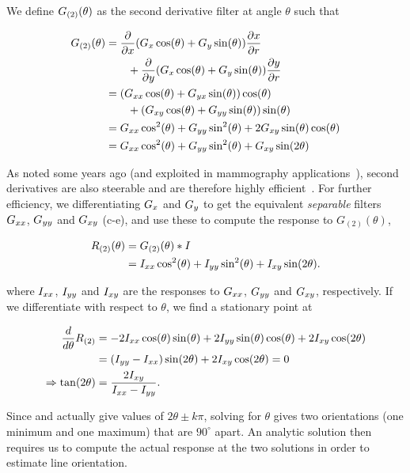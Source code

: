 We define $G_{(2)}(\theta)$ as the second derivative filter at angle $\theta$ such that

\begin{align}
\G_{(2)}(\theta)
	&= 	\frac{\partial}{\partial x}(\Gx \cos(\theta) + \Gy \sin(\theta))\frac{\partial x}{\partial r} \notag\\
		&\qquad + \frac{\partial}{\partial y}(\Gx \cos(\theta) + \Gy \sin(\theta))\frac{\partial y}{\partial r} \\
%
	&= 	(\Gxx \cos(\theta) + \Gyx \sin(\theta))\cos(\theta) \notag\\
		&\qquad + (\Gxy \cos(\theta) + \Gyy \sin(\theta))\sin(\theta) \\
%
	&= 	\Gxx\cos^2(\theta) + \Gyy\sin^2(\theta) + 2\Gxy\sin(\theta)\cos(\theta) \\
%
	&=	\Gxx\cos^2(\theta) + \Gyy\sin^2(\theta) + \Gxy\sin(2\theta)
\label{e:ddG}
\end{align}

As noted some years ago (and exploited in mammography applications~\cite{Karssemeijer_teBrake_TMI96}), second derivatives are also steerable and are therefore highly efficient~\cite{Freeman_Adelson_TPAMI91,Koenderink_vanDoorn_TPAMI92}. For further efficiency, we differentiating $G_x$ and $G_y$ to get the equivalent \emph{separable} filters $G_{xx}$, $G_{yy}$ and $G_{xy}$ (c-e), and use these to compute the response to $G_{(2)}(\theta)$,

\begin{align}
R_{(2)}(\theta)
	&= 	G_{(2)}(\theta) \ast I \\
	&=	I_{xx}\cos^2(\theta) + I_{yy}\sin^2(\theta) + I_{xy}\sin(2\theta).
\label{e:R2}
\end{align}

\noindent where $I_{xx}$, $I_{yy}$ and $I_{xy}$ are the responses to $G_{xx}$, $G_{yy}$ and $G_{xy}$, respectively. If we differentiate with respect to $\theta$, we find a stationary point at

\begin{align}
\frac{d}{d\theta}R_{(2)}
	&= 	-2I_{xx}\cos(\theta)\sin(\theta) + 2I_{yy}\sin(\theta)\cos(\theta) + 2I_{xy}\cos(2\theta) \\
	&= 	(I_{yy}-I_{xx})\sin(2\theta) + 2I_{xy}\cos(2\theta) = 0 \\
\Rightarrow \tan(2\theta)
	&= 	\frac{2I_{xy}}{I_{xx}-I_{yy}}.
\label{e:t2}
\end{align}

Since  and  actually give values of $2\theta \pm k\pi$, solving for $\theta$ gives two orientations (one minimum and one maximum) that are $90^\circ$ apart. An analytic solution then requires us to compute the actual response at the two solutions in order to estimate line orientation. 


